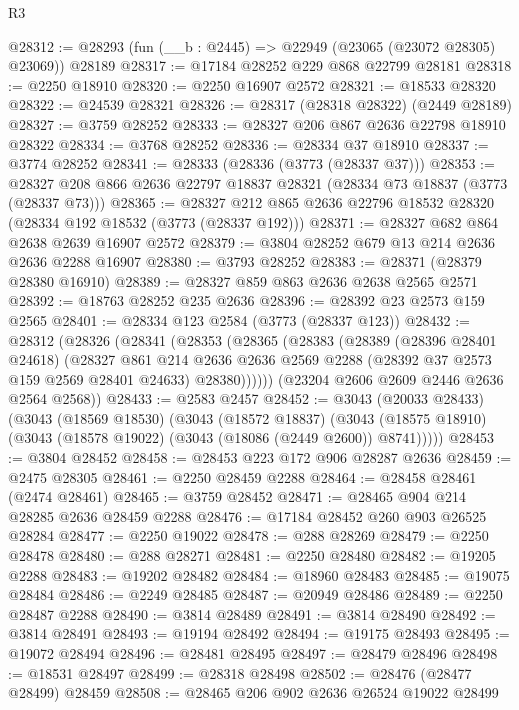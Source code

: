 \begin{lexlean}{R3}
\begin{coremodule}
@28312 := @28293 (fun (__b : @2445) => @22949 (@23065 (@23072 @28305) @23069)) @28189
@28317 := @17184 @28252 @229 @868 @22799 @28181
@28318 := @2250 @18910
@28320 := @2250 @16907 @2572
@28321 := @18533 @28320
@28322 := @24539 @28321
@28326 := @28317 (@28318 @28322) (@2449 @28189)
@28327 := @3759 @28252
@28333 := @28327 @206 @867 @2636 @22798 @18910 @28322
@28334 := @3768 @28252
@28336 := @28334 @37 @18910
@28337 := @3774 @28252
@28341 := @28333 (@28336 (@3773 (@28337 @37)))
@28353 := @28327 @208 @866 @2636 @22797 @18837 @28321 (@28334 @73 @18837 (@3773 (@28337 @73)))
@28365 := @28327 @212 @865 @2636 @22796 @18532 @28320 (@28334 @192 @18532 (@3773 (@28337 @192)))
@28371 := @28327 @682 @864 @2638 @2639 @16907 @2572
@28379 := @3804 @28252 @679 @13 @214 @2636 @2636 @2288 @16907
@28380 := @3793 @28252
@28383 := @28371 (@28379 @28380 @16910)
@28389 := @28327 @859 @863 @2636 @2638 @2565 @2571
@28392 := @18763 @28252 @235 @2636
@28396 := @28392 @23 @2573 @159 @2565
@28401 := @28334 @123 @2584 (@3773 (@28337 @123))
@28432 := @28312
    (@28326
      (@28341
        (@28353
          (@28365
            (@28383
              (@28389
                (@28396 @28401 @24618)
                (@28327
                  @861
                  @214
                  @2636
                  @2636
                  @2569
                  @2288
                  (@28392 @37 @2573 @159 @2569 @28401 @24633)
                  @28380))))))
      (@23204 @2606 @2609 @2446 @2636 @2564 @2568))
@28433 := @2583 @2457
@28452 := @3043
    (@20033 @28433)
    (@3043
      (@18569 @18530)
      (@3043
        (@18572 @18837)
        (@3043 (@18575 @18910) (@3043 (@18578 @19022) (@3043 (@18086 (@2449 @2600)) @8741)))))
@28453 := @3804 @28452
@28458 := @28453 @223 @172 @906 @28287 @2636
@28459 := @2475 @28305
@28461 := @2250 @28459 @2288
@28464 := @28458 @28461 (@2474 @28461)
@28465 := @3759 @28452
@28471 := @28465 @904 @214 @28285 @2636 @28459 @2288
@28476 := @17184 @28452 @260 @903 @26525 @28284
@28477 := @2250 @19022
@28478 := @288 @28269
@28479 := @2250 @28478
@28480 := @288 @28271
@28481 := @2250 @28480
@28482 := @19205 @2288
@28483 := @19202 @28482
@28484 := @18960 @28483
@28485 := @19075 @28484
@28486 := @2249 @28485
@28487 := @20949 @28486
@28489 := @2250 @28487 @2288
@28490 := @3814 @28489
@28491 := @3814 @28490
@28492 := @3814 @28491
@28493 := @19194 @28492
@28494 := @19175 @28493
@28495 := @19072 @28494
@28496 := @28481 @28495
@28497 := @28479 @28496
@28498 := @18531 @28497
@28499 := @28318 @28498
@28502 := @28476 (@28477 @28499) @28459
@28508 := @28465 @206 @902 @2636 @26524 @19022 @28499

\end{coremodule}
\end{lexlean}
